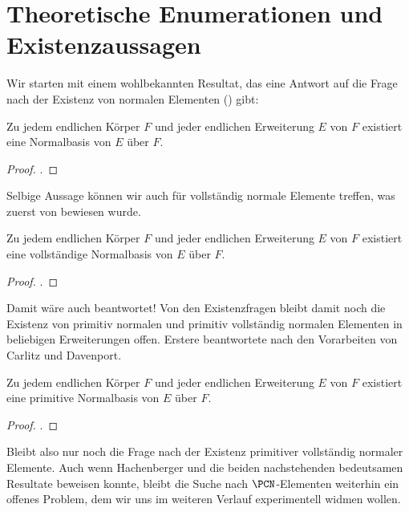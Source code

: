 \section{Theoretische Enumerationen und Existenzaussagen}


Wir starten mit einem wohlbekannten Resultat, das eine Antwort auf die Frage
nach der Existenz von normalen Elementen () gibt:

\begin{satz}
  Zu jedem endlichen Körper $F$ und jeder endlichen Erweiterung $E$ von $F$
  existiert eine Normalbasis von $E$ über $F$.
\end{satz}
\begin{proof}
  \autocite[Theorem 2.35]{lidl1997finite}.
\end{proof}

Selbige Aussage können wir auch für vollständig normale Elemente treffen, was
zuerst \citeyear{blessenohl1986} von \citeauthor{blessenohl1986}
\autocite{blessenohl1986} bewiesen wurde.

\begin{satz}
  Zu jedem endlichen Körper $F$ und jeder endlichen Erweiterung $E$ von $F$
  existiert eine vollständige Normalbasis von $E$ über $F$.
\end{satz}
\begin{proof}
  \autocite[Satz 1.2]{blessenohl1986}.
\end{proof}


Damit wäre auch  beantwortet! Von den Existenzfragen bleibt
damit noch die Existenz von primitiv normalen und primitiv vollständig normalen
Elementen in beliebigen Erweiterungen offen. Erstere beantwortete
\citeauthor{lenstra1987} \citeyear{lenstra1987} \autocite{lenstra1987}
nach den Vorarbeiten von Carlitz und Davenport.

\begin{satz}
  \label{satz:primitive_normalbasis}
  Zu jedem endlichen Körper $F$ und jeder endlichen Erweiterung $E$ von $F$
  existiert eine primitive Normalbasis von $E$ über $F$.
\end{satz}
\begin{proof}
  \autocite{lenstra1987}.
\end{proof}


Bleibt also nur noch die Frage nach der Existenz primitiver vollständig
normaler Elemente. Auch wenn Hachenberger 
\citeyear{hachenberger2001} \autocite{hachenberger2001} und 
\citeyear{hachenberger2014} \autocite{hachenberger2014} die beiden
nachstehenden bedeutsamen Resultate beweisen konnte, bleibt die Suche nach 
$\PCN$-Elementen weiterhin ein offenes Problem, dem wir uns im weiteren Verlauf
experimentell widmen wollen.

